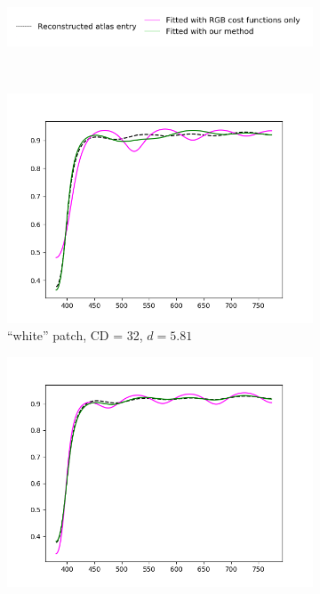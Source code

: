 \begin{figure}[t]
	\centering
	\captionsetup[subfigure]{font=footnotesize,labelfont=footnotesize}
	\captionsetup[subfigure]{justification=centering}
	\begin{subfigure}[t]{0.70\textwidth}
		\includegraphics[width=\linewidth]{img/results_costFunctions_legend.png}
	\end{subfigure} \\
	\begin{subfigure}[t]{0.45\textwidth}
		\includegraphics[width=\linewidth]{img/results_costFunctions_white_cd32.png}
		\caption{``white'' patch, CD = 32, $d = 5.81$}
		\label{fig:resultsCostFunctions_white32}
	\end{subfigure} \hspace{0.1em}
	\begin{subfigure}[t]{0.45\textwidth}
		\includegraphics[width=\linewidth]{img/results_costFunctions_white_cd64.png}

\end{subfigure}
\end{figure}
